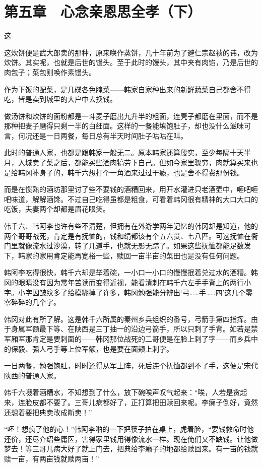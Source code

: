 \section{第五章　心念亲恩思全孝（下）}

这

这炊饼便是武大郎卖的那种，原来唤作蒸饼，几十年前为了避仁宗赵祯的讳，改为炊饼。其实呢，也就是后世的馒头。至于此时的馒头，其中夹有肉馅，乃是后世的肉包子；菜包则唤作素馒头。

作为下饭的配菜，是几碟各色腌菜——韩家自家种出来的新鲜蔬菜自己都舍不得吃，皆是卖到城里的大户中去换钱。

做汤饼和炊饼的面粉都是一斗麦子磨出九升半的粗面，连壳子都磨在里面，而不是那种把麦子磨得只剩一半的白细面。这样的一餐能填饱肚子，却也没什么滋味可言，何况还是一日两餐，每日总有半天时间肚子咕咕在叫。

此时的普通人家，也都是跟韩家一般无二。原本韩家还算殷实，至少每隔十天半月，入城卖了菜之后，都能买些酒肉犒劳下自己。但如今家里骤穷，肉就算买来也是给韩冈补身子的，韩千六想打个一角酒来过过干瘾，也是舍不得费那份钱。

而是在惯熟的酒坊那里讨了些不要钱的酒糟回来，用开水灌进只老酒壶中，咂吧咂吧味道，解解酒馋。不过自己吃得虽都是粗食，可看着韩冈很有精神的大口大口的吃饭，夫妻两个却都是眉花眼笑。

韩千六、韩阿李也许有些不清楚，但拥有在外游学两年记忆的韩冈却是知道，他的两个哥哥战死，肯定是有抚恤的，钱和绢都该有个五六贯、七八匹。可这抚恤在衙门里就像流水过沙漠，转了几道手，也就无影无踪了。如果这些抚恤都能足数发下，韩家的家用肯定能再宽裕一些，赎回一亩半亩的菜田也是没有任何问题。

韩阿李吃得很快，韩千六却是举着碗，一小口一小口的慢慢抿着兑过水的酒糟。韩冈的眼睛没有因为常年苦读而变得近视，能看清刺在韩千六左手手背上的两行小字。小字因皱纹多了给模糊掉了许多，韩冈勉强能分辨出‘弓……手……四’这几个零零碎碎的几个字。

韩冈对此有所了解。这是韩千六所属的秦州乡兵组织的番号，弓箭手第四指挥。由于身属军额最下等、在陕西是三丁抽一的沿边弓箭手，所以只刺了手背。如若是禁军厢军那肯定是要刺面的——韩冈那位战死的二哥便是在脸上刺了字——而乡兵中的保毅、强人弓手等上位军额，也是要在面颊上刺字。

一日两餐，勉强饱肚，时时还得从军上阵，死后连个抚恤都到不了手，这便是宋代陕西的普通人家。

韩千六啜着酒糟水，不知想到了什么，放下碗唉声叹气起来：“唉，人若是贪起来，连脸皮都不要了。三哥儿病都好了，正打算把田赎回来呢。李癞子倒好，竟然还想着要把典卖改成断卖！”

“呸！想疯了他的心！”韩阿李啪的一下把筷子拍在桌上，虎着脸，“要钱救命时他还价，还尽介绍些庸医，害得家里钱用得像流水一样。现在俺们又不缺钱。让他做梦去！等三哥儿病大好了就上门去，把典给李癞子的地都给赎回来。有一亩的钱就赎一亩，有两亩钱就赎两亩！”

